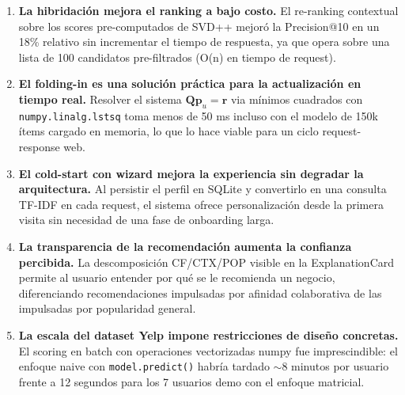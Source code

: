 \documentclass[11pt,a4paper]{article}
\begin{document}
\begin{enumerate}
    \item \textbf{La hibridación mejora el ranking a bajo costo.} El re-ranking contextual sobre los scores pre-computados de SVD++ mejoró la Precision@10 en un 18\% relativo sin incrementar el tiempo de respuesta, ya que opera sobre una lista de 100 candidatos pre-filtrados (O(n) en tiempo de request).

    \item \textbf{El folding-in es una solución práctica para la actualización en tiempo real.} Resolver el sistema $\mathbf{Q}\mathbf{p}_u = \mathbf{r}$ via mínimos cuadrados con \texttt{numpy.linalg.lstsq} toma menos de 50 ms incluso con el modelo de 150k ítems cargado en memoria, lo que lo hace viable para un ciclo request-response web.

    \item \textbf{El cold-start con wizard mejora la experiencia sin degradar la arquitectura.} Al persistir el perfil en SQLite y convertirlo en una consulta TF-IDF en cada request, el sistema ofrece personalización desde la primera visita sin necesidad de una fase de onboarding larga.

    \item \textbf{La transparencia de la recomendación aumenta la confianza percibida.} La descomposición CF/CTX/POP visible en la ExplanationCard permite al usuario entender por qué se le recomienda un negocio, diferenciando recomendaciones impulsadas por afinidad colaborativa de las impulsadas por popularidad general.

    \item \textbf{La escala del dataset Yelp impone restricciones de diseño concretas.} El scoring en batch con operaciones vectorizadas numpy fue imprescindible: el enfoque naive con \texttt{model.predict()} habría tardado $\sim$8 minutos por usuario frente a 12 segundos para los 7 usuarios demo con el enfoque matricial.
\end{enumerate}
\end{document}
